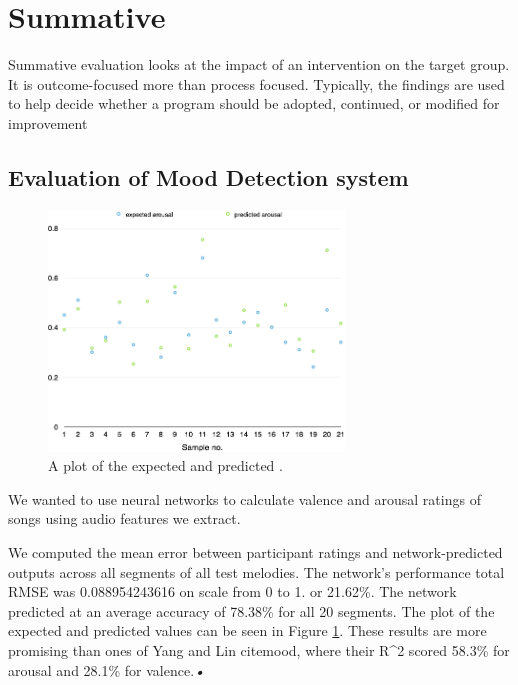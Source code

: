 \section{Summative}
Summative evaluation looks at the impact of an intervention on the target group. It is outcome-focused more than process focused. Typically, the findings are used to help decide whether a program should be adopted, continued, or modified for improvement

\vspace{10pt}

\subsection{Evaluation of Mood Detection system}

\begin{figure}[t]
    \includegraphics[width=0.7\textwidth]{Figures/finalarousal}
    \centering

  \caption{A plot of the expected and predicted .}
  \label{fig:anneval}
\end{figure}


We wanted to use neural networks to calculate valence and arousal ratings of songs using audio features we extract. 

We computed the mean error between participant ratings and network-predicted outputs across all segments of all test melodies. The network's performance total RMSE was 0.088954243616 on scale from 0 to 1. or 21.62\%.
The network predicted at an average accuracy of 78.38\% for all 20 segments. The plot of the expected and predicted values can be seen in Figure \ref{fig:anneval}.
These results are more promising than ones of Yang and Lin cite{mood}, where their R^2 scored 58.3\% for arousal and 28.1\% for valence.\textit{•}


